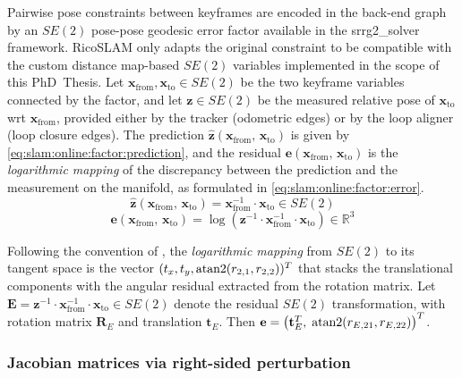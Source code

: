 Pairwise pose constraints between keyframes are encoded in the back-end graph by
an $SE(2)$ pose-pose geodesic error factor available in the
srrg2\_solver~\cite{grisetti:robotics:2020} framework. RicoSLAM only adapts
the original constraint to be compatible with the custom distance map-based
$SE(2)$ variables implemented in the scope of this PhD~Thesis.
Let $\mathbf{x}_{\mathrm{from}}, \mathbf{x}_{\mathrm{to}} \in SE(2)$
be the two keyframe variables connected by the factor, and let
$\mathbf{z}\in SE(2)$ be the measured relative pose of $\mathbf{x}_{\mathrm{to}}$
\gls{wrt} $\mathbf{x}_{\mathrm{from}}$, provided either by the tracker
(odometric edges) or by the loop aligner (loop closure edges).
The prediction $\hat{\mathbf{z}}\!\left(\mathbf{x}_{\mathrm{from}},\,\mathbf{x}_{\mathrm{to}}\right)$
is given by \eqref{eq:slam:online:factor:prediction}, and the residual
$\mathbf{e}\!\left(\mathbf{x}_{\mathrm{from}},\,\mathbf{x}_{\mathrm{to}}\right)$
is the \emph{logarithmic mapping} of the discrepancy between the prediction and
the measurement on the manifold, as formulated in
\eqref{eq:slam:online:factor:error}.
\begin{equation}
\label{eq:slam:online:factor:prediction}
\hat{\mathbf{z}}\!\left(\mathbf{x}_{\mathrm{from}},\,\mathbf{x}_{\mathrm{to}}\right)
= \mathbf{x}_{\mathrm{from}}^{-1}\cdot\mathbf{x}_{\mathrm{to}} \in SE(2)
\end{equation}
\begin{equation}
\label{eq:slam:online:factor:error}
\mathbf{e}\!\left(\mathbf{x}_{\mathrm{from}},\,\mathbf{x}_{\mathrm{to}}\right) =
\log\!\left(\mathbf{z}^{-1}\cdot
            \mathbf{x}_{\mathrm{from}}^{-1}\cdot\mathbf{x}_{\mathrm{to}}\right)
\in \mathbb{R}^3
\end{equation}

Following the convention of
, the
\emph{logarithmic mapping} from $SE(2)$ to its tangent space is the vector
$(t_x, t_y, \atan2(r_{2,1}, r_{2,2}))^T$ that stacks the translational
components with the angular residual extracted from the rotation matrix.
Let $\mathbf{E} = \mathbf{z}^{-1}\cdot\mathbf{x}_{\mathrm{from}}^{-1}\cdot
\mathbf{x}_{\mathrm{to}}\in SE(2)$ denote the residual $SE(2)$
transformation, with rotation matrix $\mathbf{R}_E$ and translation
$\mathbf{t}_E$. Then
$\mathbf{e} = \left(\mathbf{t}_E^T,\;\atan2(r_{E,21}, r_{E,22})\right)^T$.

\subsubsection{Jacobian matrices via right-sided perturbation}
\label{sec:slam:online:factor:jacobian}

